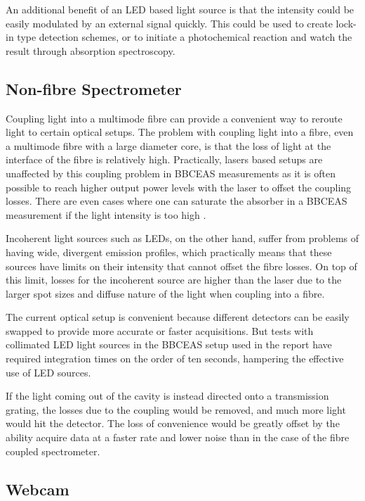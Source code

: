 An additional benefit of an \ac{LED} based light source is that the intensity
could be easily modulated by an external signal quickly. This could be used to
create lock-in type detection schemes, or to initiate a photochemical reaction
and watch the result through absorption spectroscopy.



\subsection{Non-fibre Spectrometer}\label{subsec:bbceas_no_fibre}

Coupling light into a multimode fibre can provide a convenient way to reroute
light to certain optical setups. The problem with coupling light into a fibre,
even a multimode fibre with a large diameter core, is that the loss of light at
the interface of the fibre is relatively high. Practically, lasers based setups
are unaffected by this coupling problem in \ac{BBCEAS} measurements as it is
often possible to reach higher output power levels with the laser to offset the
coupling losses.  There are even cases where one can saturate the absorber in a
\ac{BBCEAS} measurement if the light intensity is too high
\cite{Giuliano:1967hw}.

Incoherent light sources such as \acp{LED}, on the other hand, suffer from
problems of having wide, divergent emission profiles, which practically means
that these sources have limits on their intensity that cannot offset the fibre
losses. On top of this limit, losses for the incoherent source are higher than
the laser due to the larger spot sizes and diffuse nature of the light when
coupling into a fibre.

The current optical setup is convenient because different detectors can be
easily swapped to provide more accurate or faster acquisitions. But tests with
collimated \ac{LED} light sources in the \ac{BBCEAS} setup used in the report
have required integration times on the order of ten seconds, hampering the
effective use of \ac{LED} sources.

If the light coming out of the cavity is instead directed onto a transmission
grating, the losses due to the coupling would be removed, and much more light
would hit the detector. The loss of convenience would be greatly offset by the
ability acquire data at a faster rate and lower noise than in the case of the
fibre coupled spectrometer.



\subsection{Webcam}\label{subsec:bbceas_webcam}

